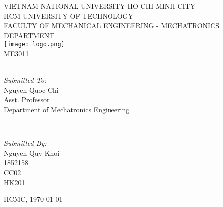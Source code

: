 	\begin{titlepage}
	\centering
	\small VIETNAM NATIONAL UNIVERSITY HO CHI MINH CITY\\
	HCM UNIVERSITY OF TECHNOLOGY\\
	FACULTY OF MECHANICAL ENGINEERING - MECHATRONICS DEPARTMENT\\[0.1\linewidth]
	
	\texttt{[image: logo.png]}\\[0.1\linewidth]	%
	\normalsize ME3011\\[0.05\linewidth]
	{\huge \bfseries \thetitle}\\[0.2\linewidth]
	
	\begin{minipage}[t]{0.4\textwidth}
		\begin{flushleft} \large
			\emph{Submitted To:}\\
			Nguyen Quoc Chi\\
			Asst. Professor\\
			Department of Mechatronics Engineering\\
		\end{flushleft}
	\end{minipage}~
	\begin{minipage}[t]{0.4\textwidth}
		
		\begin{flushright} \large
			\emph{Submitted By:} \\
			Nguyen Quy Khoi\\
			1852158\\
			CC02\\
			HK201\\
		\end{flushright}
		
	\end{minipage}
	\mbox{}\vfill
	{\large HCMC, \today}
\end{titlepage}